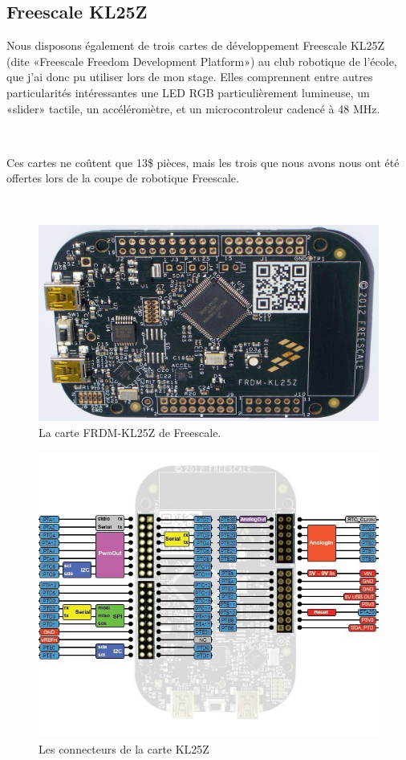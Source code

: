 \documentclass{article}
\begin{document}
\clearpage

\subsection{Freescale KL25Z}
\label{freescale}

Nous disposons également de trois cartes de développement Freescale KL25Z (dite «Freescale Freedom Development Platform») au club robotique de l’école, que j’ai donc pu utiliser lors de mon stage. Elles comprennent entre autres particularités intéressantes une LED RGB particulièrement lumineuse, un «slider» tactile, un accéléromètre, et un microcontroleur cadencé à 48 MHz.

~

Ces cartes ne coûtent que 13\$ pièces, mais les trois que nous avons nous ont été offertes lors de la coupe de robotique Freescale.

~

\begin{figure}[h!]
    \centering\includegraphics[width=\linewidth*2/3]{img/freescale.jpg}
    \caption{La carte FRDM-KL25Z de Freescale.}
\end{figure}

\begin{figure}[h!]
    \centering\includegraphics[width=\linewidth*2/3]{img/kl25z-pinout.jpg}
    \caption{Les connecteurs de la carte KL25Z}
\end{figure}
\end{document}
